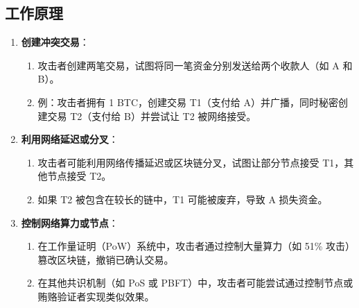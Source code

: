 \documentclass[12pt]{ctexart}
\begin{document}
\subsection{工作原理}
\begin{enumerate}
    \item \textbf{创建冲突交易}：
        \begin{enumerate}
            \item 攻击者创建两笔交易，试图将同一笔资金分别发送给两个收款人（如 A 和 B）。
            \item 例：攻击者拥有 1 BTC，创建交易 T1（支付给 A）并广播，同时秘密创建交易 T2（支付给 B）并尝试让 T2 被网络接受。
        \end{enumerate}
    \item \textbf{利用网络延迟或分叉}：
        \begin{enumerate}
            \item 攻击者可能利用网络传播延迟或区块链分叉，试图让部分节点接受 T1，其他节点接受 T2。
            \item 如果 T2 被包含在较长的链中，T1 可能被废弃，导致 A 损失资金。
        \end{enumerate}
    \item \textbf{控制网络算力或节点}：
        \begin{enumerate}
            \item 在工作量证明（PoW）系统中，攻击者通过控制大量算力（如 51\% 攻击）篡改区块链，撤销已确认交易。
            \item 在其他共识机制（如 PoS 或 PBFT）中，攻击者可能尝试通过控制节点或贿赂验证者实现类似效果。
        \end{enumerate}
\end{enumerate}
\end{document}
